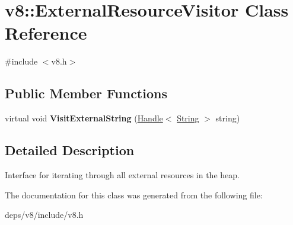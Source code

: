 \hypertarget{classv8_1_1_external_resource_visitor}{}\section{v8\+:\+:External\+Resource\+Visitor Class Reference}
\label{classv8_1_1_external_resource_visitor}


{\ttfamily \#include $<$v8.\+h$>$}

\subsection*{Public Member Functions}
\begin{DoxyCompactItemize}
\item 
\hypertarget{classv8_1_1_external_resource_visitor_ab00ff4cd0d0167894faa8331b68a58c6}{}virtual void {\bfseries Visit\+External\+String} (\hyperlink{classv8_1_1_local}{Handle}$<$ \hyperlink{classv8_1_1_string}{String} $>$ string)\label{classv8_1_1_external_resource_visitor_ab00ff4cd0d0167894faa8331b68a58c6}

\end{DoxyCompactItemize}


\subsection{Detailed Description}
Interface for iterating through all external resources in the heap. 

The documentation for this class was generated from the following file\+:\begin{DoxyCompactItemize}
\item 
deps/v8/include/v8.\+h\end{DoxyCompactItemize}
